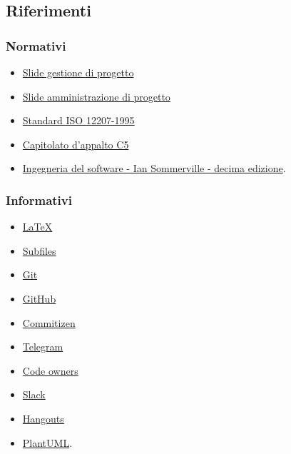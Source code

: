 \documentclass[../norme-di-progetto.tex]{subfiles}
\begin{document}
\subsection{Riferimenti}%
\label{sub:riferimenti}

\subsubsection{Normativi}%
\label{subs:riferimenti/normativi}

\begin{itemize}
  \item \href{https://www.math.unipd.it/~tullio/IS-1/2019/Dispense/L06.pdf}{Slide gestione di progetto}
  \item \href{https://www.math.unipd.it/~tullio/IS-1/2019/Dispense/FC01.pdf}{Slide amministrazione di progetto}
  \item \href{https://www.math.unipd.it/~tullio/IS-1/2009/Approfondimenti/ISO_12207-1995.pdf}{Standard ISO 12207-1995}
  \item \href{https://www.math.unipd.it/~tullio/IS-1/2019/Progetto/C5.pdf}{Capitolato d'appalto C5}
  \item \href{https://www.pearson.it/opera/pearson/0-6424-ingegneria_del_software}{Ingegneria del software - Ian Sommerville - decima edizione}.
\end{itemize}

\subsubsection{Informativi}%
\label{subs:riferimenti/informativi}

\begin{itemize}
  \item \href{https://www.latex-project.org/help/documentation/}{\LaTeX}
  \item \href{https://www.overleaf.com/learn/latex/Multi-file_LaTeX_projects#The_subfiles_package}{Subfiles}
  \item \href{https://git-scm.com/}{Git}
  \item \href{https://github.com/}{GitHub}
  \item \href{https://commitizen.github.io/cz-cli/}{Commitizen}
  \item \href{https://desktop.telegram.org/}{Telegram}
  \item \href{https://help.github.com/en/github/creating-cloning-and-archiving-repositories/about-code-owners}{Code owners}
  \item \href{https://slack.com/intl/en-it/}{Slack}
  \item \href{https://hangouts.google.com}{Hangouts}
  \item \href{https://plantuml.com/}{PlantUML}.
\end{itemize}
\end{document}
